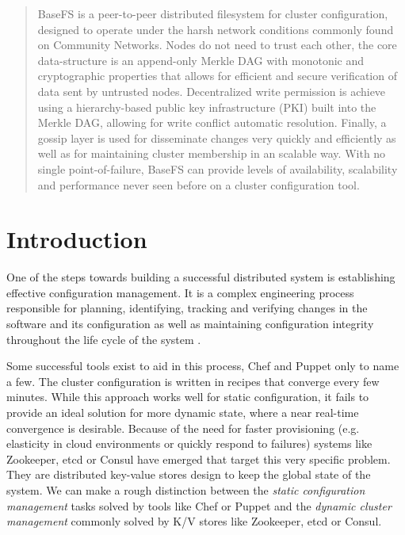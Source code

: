 \documentclass{sig-alternate}
\begin{document}
\maketitle

\begin{abstract}
BaseFS is a peer-to-peer distributed filesystem for cluster configuration, designed to operate under the harsh network conditions commonly found on Community Networks. Nodes do not need to trust each other, the core data-structure is an append-only Merkle DAG with monotonic and cryptographic properties that allows for efficient and secure verification of data sent by untrusted nodes. Decentralized write permission is achieve using a hierarchy-based public key infrastructure (PKI) built into the Merkle DAG, allowing for write conflict automatic resolution. Finally, a gossip layer is used for disseminate changes very quickly and efficiently as well as for maintaining cluster membership in an scalable way. With no single point-of-failure, BaseFS can provide levels of availability, scalability and performance never seen before on a cluster configuration tool.

\end{abstract}
\section{Introduction}

One of the steps towards building a successful distributed system is establishing effective configuration management. It is a complex engineering process responsible for planning, identifying, tracking and verifying changes in the software and its configuration as well as maintaining configuration integrity throughout the life cycle of the system \cite{Yermolaiev:managing}.

Some successful tools exist to aid in this process, Chef and Puppet only to name a few. The cluster configuration is written in recipes that converge every few minutes. While this approach works well for static configuration, it fails to provide an ideal solution for more dynamic state, where a near real-time convergence is desirable. Because of the need for faster provisioning (e.g. elasticity in cloud environments or quickly respond to failures) systems like Zookeeper, etcd or Consul have emerged that target this very specific problem. They are distributed key-value stores design to keep the global state of the system. We can make a rough distinction between the \textit{static configuration management} tasks solved by tools like Chef or Puppet and the \textit{dynamic cluster management} commonly solved by K/V stores like Zookeeper, etcd or Consul.
\end{document}
